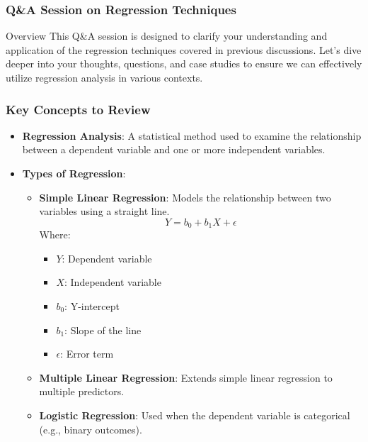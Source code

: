 \documentclass[aspectratio=169]{beamer}
\begin{document}
\begin{frame}[fragile]
    \frametitle{Q\&A Session on Regression Techniques}
    \begin{block}{Overview}
        This Q\&A session is designed to clarify your understanding and application of the regression techniques covered in previous discussions.
        Let's dive deeper into your thoughts, questions, and case studies to ensure we can effectively utilize regression analysis in various contexts.
    \end{block}
\end{frame}

\begin{frame}[fragile]
    \frametitle{Key Concepts to Review}
    \begin{itemize}
        \item \textbf{Regression Analysis}: A statistical method used to examine the relationship between a dependent variable and one or more independent variables.
        
        \item \textbf{Types of Regression}:
            \begin{itemize}
                \item \textbf{Simple Linear Regression}: Models the relationship between two variables using a straight line.
                    \begin{equation}
                        Y = b_0 + b_1X + \epsilon
                    \end{equation}
                    Where:
                    \begin{itemize}
                        \item \( Y \): Dependent variable
                        \item \( X \): Independent variable
                        \item \( b_0 \): Y-intercept
                        \item \( b_1 \): Slope of the line
                        \item \( \epsilon \): Error term
                    \end{itemize}
                \item \textbf{Multiple Linear Regression}: Extends simple linear regression to multiple predictors.
                \item \textbf{Logistic Regression}: Used when the dependent variable is categorical (e.g., binary outcomes).
            \end{itemize}
    \end{itemize}
\end{frame}
\end{document}
